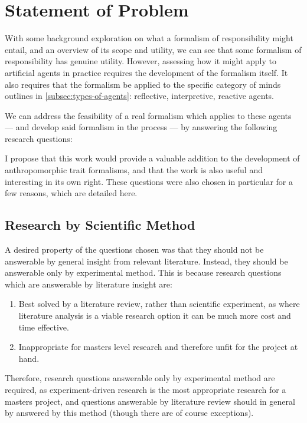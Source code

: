 \section{Statement of Problem}\label{sec:statement_of_problem}

With some background exploration on what a formalism of responsibility might entail, and an overview of its scope and utility, we can see that some formalism of responsibility has genuine utility. However, assessing how it might apply to artificial agents in practice requires the development of the formalism itself. It also requires that the formalism be applied to the specific category of minds outlines in \cref{subsec:types-of-agents}: reflective, interpretive, reactive agents. \par

We can address the feasibility of a real formalism which applies to these agents --- and develop said formalism in the process --- by answering the following research questions:



I propose that this work would provide a valuable addition to the development of anthropomorphic trait formalisms, and that the work is also useful and interesting in its own right. These questions were also chosen in particular for a few reasons, which are detailed here. \par

\subsection{Research by Scientific Method}

A desired property of the questions chosen was that they should not be answerable by general insight from relevant literature. Instead, they should be answerable only by experimental method. This is because research questions which are answerable by literature insight are:
\begin{enumerate}[label=\emph{\Alph*}:]
    \item Best solved by a literature review, rather than scientific experiment, as where literature analysis is a viable research option it can be much more cost and time effective.
    \item Inappropriate for masters level research and therefore unfit for the project at hand.
\end{enumerate}

Therefore, research questions answerable only by experimental method are required, as experiment-driven research is the most appropriate research for a masters project, and questions answerable by literature review should in general by answered by this method (though there are of course exceptions).\par

